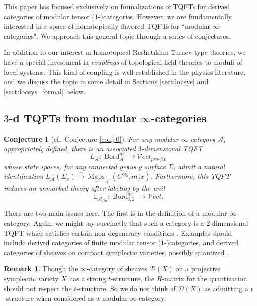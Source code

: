\documentclass[reqno]{amsart}
\newtheorem{conjecture}[lemma]{Conjecture}
\theoremstyle{definition}
\newtheorem{remark}[lemma]{Remark}
\newcommand{\mbb}[1]{\mathbb{#1}}
\newcommand{\msc}[1]{\mathscr{#1}}
\newcommand{\ot}{\otimes}
\newcommand{\Vect}{\msc{V}\!ect}
\newcommand{\pf}{pro\text{-}fin}
\DeclareMathOperator{\Maps}{Maps}
\DeclareMathOperator{\Bord}{Bord}
\renewcommand{\1}{\mathbf{1}}
\begin{document}
This paper has focused exclusively on formalizations of TQFTs for derived categories of modular tensor ($1$-)categories. However, we are fundamentally interested in a space of homotopically flavored TQFTs for ``modular $\infty$-categories".  We approach this general topic through a series of conjectures.
\par

In addition to our interest in homotopical Reshetikhin-Turaev type theories, we have a special investment in \emph{couplings} of topological field theories to moduli of local systems. This kind of coupling is well-established in the physics literature, and we discuss the topic in some detail in Sections \ref{sect:locsys} and \ref{sect:locsys_formal} below.


\subsection{$3$-d TQFTs from modular $\infty$-categories}

\begin{conjecture}[cf.\ Conjecture \ref{conj:0}]\label{conj:1}
For any modular $\infty$-category $\msc{A}$, appropriately defined, there is an associated $3$-dimensional TQFT
\[
L_{\msc{A}}:\Bord^{nc}_{\msc{A}}\to \Vect_{\pf}
\]
whose state spaces, for any connected genus $g$ surface $\Sigma$, admit a natural identification $L_{\msc{A}}(\Sigma_x)\overset{\sim}\to \underline{\Maps}_{\msc{A}}(C^{\ot g},m_fx)$.  Furthermore, this TQFT induces an unmarked theory after labeling by the unit
\[
\mbb{L}_{\msc{A}_{fin}}:\Bord^{nc}_{3,2}\to \Vect.
\]
\end{conjecture}

There are two main issues here. The first is in the definition of a modular $\infty$-category. Again, we might say succinctly that such a category is a $2$-dimensional TQFT which satisfies certain non-degeneracy conditions \cite{mullerwoike23,steinebrunner}. Examples should include derived categories of finite modular tensor ($1$-)categories, and derived categories of sheaves on compact symplectic varieties, possibly quantized \cite[Section 9.2]{robertswillerton10}.

\begin{remark}
Though the $\infty$-category of sheaves $\msc{D}(X)$ on a projective symplectic variety $X$ has a strong $t$-structure, the $R$-matrix for the quantization \cite{robertswillerton10} should not respect the $t$-structure.  So we do not think of $\msc{D}(X)$ as admitting a $t$-structure when considered as a modular $\infty$-category.
\end{remark}
\end{document}
